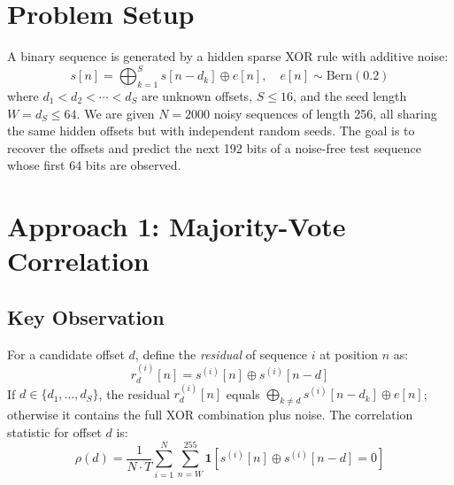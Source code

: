 \documentclass[10pt,twocolumn]{article}
\begin{document}

\section{Problem Setup}
\label{sec:setup}

A binary sequence is generated by a hidden sparse XOR rule with additive noise:
%
\begin{equation}
s[n] = \bigoplus_{k=1}^{S} s[n - d_k] \oplus e[n], \quad e[n] \sim \mathrm{Bern}(0.2)
\label{eq:rule}
\end{equation}
%
where $d_1 < d_2 < \cdots < d_S$ are unknown offsets, $S \le 16$, and
the seed length $W = d_S \le 64$.
We are given $N{=}2000$ noisy sequences of length 256,
all sharing the same hidden offsets but with independent random seeds.
The goal is to recover the offsets and predict the next 192 bits of a
noise-free test sequence whose first 64 bits are observed.

\section{Approach 1: Majority-Vote Correlation}
\label{sec:stat}

\subsection{Key Observation}

For a candidate offset $d$, define the \emph{residual} of sequence $i$ at position $n$ as:
%
\begin{equation}
r^{(i)}_d[n] = s^{(i)}[n] \oplus s^{(i)}[n-d]
\label{eq:residual}
\end{equation}
%
If $d \in \{d_1,\ldots,d_S\}$, the residual $r^{(i)}_d[n]$ equals
$\bigoplus_{k \ne d} s^{(i)}[n-d_k] \oplus e[n]$; otherwise it contains
the full XOR combination plus noise.
The correlation statistic for offset $d$ is:
%
\begin{equation}
\rho(d) = \frac{1}{N \cdot T} \sum_{i=1}^{N} \sum_{n=W}^{255}
    \mathbf{1}\!\left[s^{(i)}[n] \oplus s^{(i)}[n-d] = 0\right]
\label{eq:rho}
\end{equation}
\end{document}
